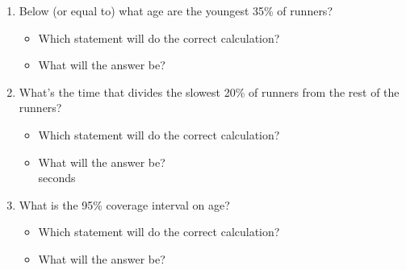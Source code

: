 \begin{enumerate}
\item Below (or equal to)  what age are the youngest 35\% of
  runners?

\begin{itemize}
\item Which statement will do the correct calculation?
\begin{MultipleChoice}
\end{MultipleChoice}

\item What will the answer be? \\
\end{itemize}

\bigskip

\item What's the  time that divides the slowest 20\% of
  runners from the rest of the runners?

\begin{itemize}
\item Which statement will do the correct calculation?
\begin{MultipleChoice}
\end{MultipleChoice}

\item What will the answer be?\\
seconds
\end{itemize}

\bigskip

\item What is the 95\% coverage interval on age?
\begin{itemize}
\item Which statement will do the correct calculation?
\begin{MultipleChoice}
\end{MultipleChoice}

\item What will the answer be?
\begin{MultipleChoice}
\end{MultipleChoice}
\end{itemize}


\end{enumerate}
